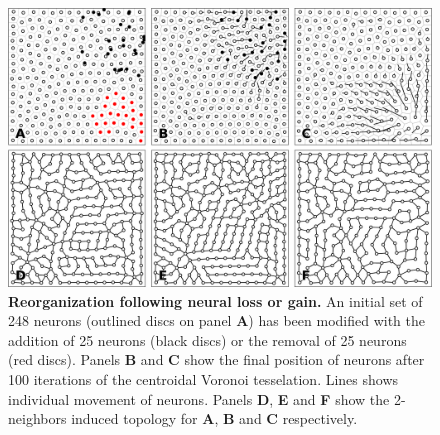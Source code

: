 \begin{figure}
  \includegraphics[width=\columnwidth]{figures/vsom-resilience.pdf}
  \caption{\textbf{Reorganization following neural loss or gain.}  An initial
    set of 248 neurons (outlined discs on panel \textbf{A}) has been modified
    with the addition of 25 neurons (black discs) or the removal of 25 neurons
    (red discs). Panels \textbf{B} and \textbf{C} show the final position of
    neurons after 100 iterations of the centroidal Voronoi tesselation. Lines
    shows individual movement of neurons. Panels \textbf{D}, \textbf{E} and
    \textbf{F} show the 2-neighbors induced topology for \textbf{A},
    \textbf{B} and \textbf{C} respectively.}
  \label{fig:CVT}
\end{figure}



